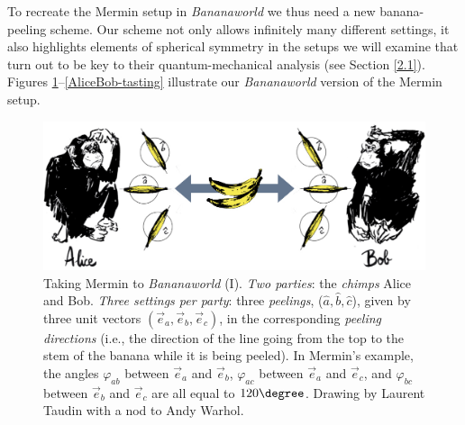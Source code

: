 To recreate the Mermin setup in \emph{Bananaworld} we thus need a new banana-peeling scheme. Our scheme not only allows infinitely many different settings, it also highlights elements of spherical symmetry in the setups we will examine that turn out to be key to their quantum-mechanical analysis (see Section \ref{2.1}). Figures \ref{AliceBob-Mermin}--\ref{AliceBob-tasting} illustrate our \emph{Bananaworld} version of the Mermin setup.  

\begin{figure}[ht]
\centering
    \includegraphics[width=4.5in]{AliceBob-Mermin.jpg}
 \caption{Taking Mermin to \emph{Bananaworld} (I). \emph{Two parties}: the \emph{chimps} Alice and Bob. \emph{Three settings per party}: three \emph{peelings}, ($\hat{a}, \hat{b}, \hat{c}$), given by three unit vectors $(\vec{e}_a, \vec{e}_b, \vec{e}_c)$, in the corresponding \emph{peeling directions} (i.e., the direction of the line going from the top to the stem of the banana while it is being peeled). In Mermin's example, the angles $\varphi_{ab}$ between $\vec{e}_a$ and $\vec{e}_b$, $\varphi_{ac}$ between $\vec{e}_a$ and $\vec{e}_c$, and $\varphi_{bc}$ between $\vec{e}_b$ and $\vec{e}_c$ are all equal to $120\degree$. Drawing by Laurent  Taudin with a nod to Andy Warhol.}
   \label{AliceBob-Mermin}
\end{figure}

